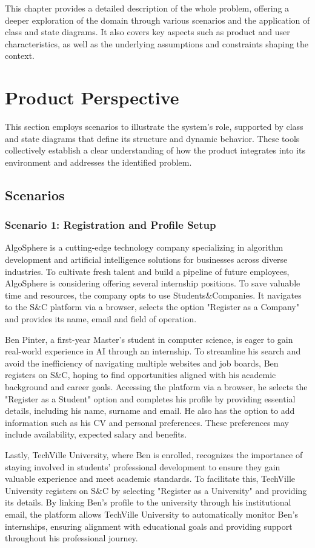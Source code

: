 This chapter provides a detailed description of the whole problem, offering a deeper exploration of the domain through various scenarios and the application of class and state diagrams.
It also covers key aspects such as product and user characteristics, as well as the underlying assumptions and constraints shaping the context.

\section{Product Perspective}
This section employs scenarios to illustrate the system's role, supported by class and state diagrams that define its structure and dynamic behavior.
These tools collectively establish a clear understanding of how the product integrates into its environment and addresses the identified problem.

\subsection{Scenarios}
\subsubsection{Scenario 1: Registration and Profile Setup}
AlgoSphere is a cutting-edge technology company specializing in algorithm development and artificial intelligence solutions for businesses across diverse industries.
To cultivate fresh talent and build a pipeline of future employees, AlgoSphere is considering offering several internship positions.
To save valuable time and resources, the company opts to use Students\&Companies.
It navigates to the S\&C platform via a browser, selects the option "Register as a Company"
and provides its name, email and field of operation.

Ben Pinter, a first-year Master's student in computer science, is eager to gain real-world experience in AI through an internship.
To streamline his search and avoid the inefficiency of navigating multiple websites and job boards, Ben registers on S\&C, hoping to find opportunities aligned with his academic background and career goals.
Accessing the platform via a browser, he selects the "Register as a Student" option and completes his profile by providing essential details, including his name, surname and email.
He also has the option to add information such as his CV and personal preferences.
These preferences may include availability, expected salary and benefits.

Lastly, TechVille University, where Ben is enrolled, recognizes the importance of staying involved in students’ professional development to ensure they gain valuable experience and meet academic standards.
To facilitate this, TechVille University registers on S\&C by selecting "Register as a University" and providing its details.
By linking Ben’s profile to the university through his institutional email, the platform allows TechVille University to automatically monitor Ben’s internships, ensuring alignment with educational goals and providing support throughout his professional journey.

